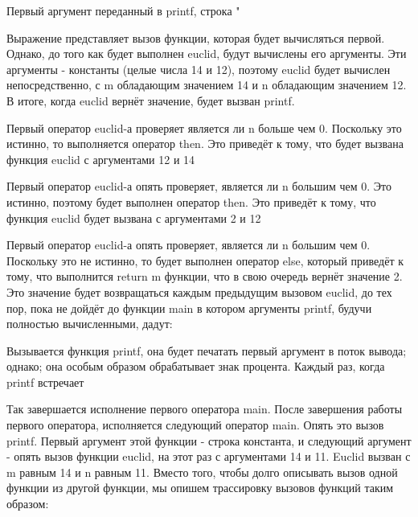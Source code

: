 Первый аргумент переданный в printf, строка "%

Выражение представляет вызов функции, которая будет вычисляться первой. Однако, до того как будет выполнен euclid, будут вычислены его аргументы. Эти аргументы - константы (целые числа 14 и 12), поэтому euclid будет вычислен непосредственно, с m обладающим значением 14 и n обладающим значением 12. В итоге, когда euclid вернёт значение, будет вызван printf.

Первый оператор euclid-а проверяет является ли n больше чем 0. Поскольку это истинно, то выполняется оператор then. Это приведёт к тому, что будет вызвана функция euclid с аргументами 12 и 14%

Первый оператор euclid-а опять проверяет, является ли n большим чем 0. Это истинно, поэтому будет выполнен оператор then. Это приведёт к тому, что функция euclid будет вызвана с аргументами 2 и 12%

Первый оператор euclid-а опять проверяет, является ли n большим чем 0. Поскольку это не истинно, то будет выполнен оператор else, который приведёт к тому, что выполнится return m функции, что в свою очередь вернёт значение 2. Это значение будет возвращаться каждым предыдущим вызовом euclid, до тех пор, пока не дойдёт до функции main в котором аргументы printf, будучи полностью вычисленными, дадут:

Вызывается функция printf, она будет печатать первый аргумент в поток вывода; однако; она особым образом обрабатывает знак процента. Каждый раз, когда printf встречает %

Так завершается исполнение первого оператора main. После завершения работы первого оператора, исполняется следующий оператор main. Опять это вызов printf. Первый аргумент этой функции - строка константа, и следующий аргумент - опять вызов функции euclid, на этот раз с аргументами 14 и 11. Euclid вызван с m равным 14 и n равным 11. Вместо того, чтобы долго описывать вызов одной функции из другой функции, мы опишем трассировку вызовов функций таким образом:

